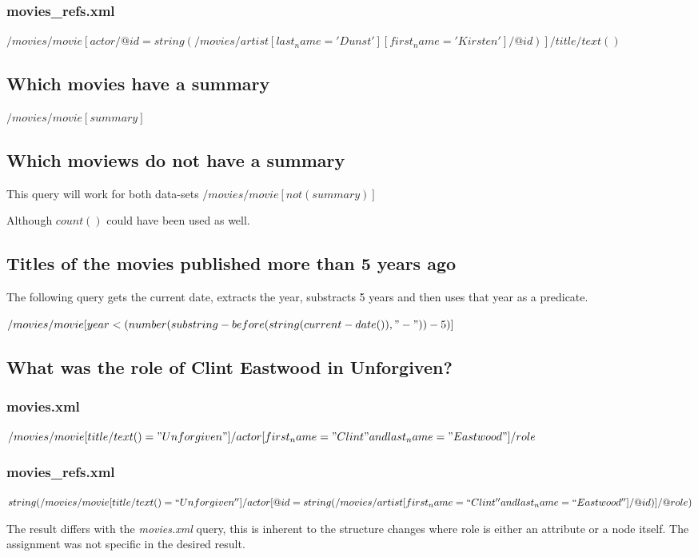 \subsubsection{movies_refs.xml}
$/movies/movie[
        actor/@id = string(/movies/artist[
            last_name='Dunst'
        ][
            first_name='Kirsten'
        ]
        /@id)
    ]
    /title/text()$

\subsection{Which movies have a summary}
$/movies/movie[summary]$

\subsection{Which moviews do not have a summary}
This query will work for both data-sets
$/movies/movie[not(summary)]$

Although $count()$ could have been used as  well.
\subsection{Titles of the movies published more than 5 years ago}
The following query gets the current date, extracts the year,
substracts 5 years and then uses that year as a predicate.

$/movies/movie[
        year < (number(substring-before(string(current-date()), "-")) -5)
    ]
$

\subsection{What was the role of Clint Eastwood in Unforgiven?}
\subsubsection{movies.xml}
$/movies/movie[title/text() = "Unforgiven"]/actor[first_name = "Clint" and last_name = "Eastwood"]/role$
\subsubsection{movies_refs.xml}
$string(/movies/movie[title/text() = ``Unforgiven'']/actor[
        @id = 
            string(/movies/artist[first_name= ``Clint'' and last_name = ``Eastwood'']/@id)
    ]/@role)
$

The result differs with the \emph{movies.xml} query, this is inherent
to the structure changes where role is either an attribute or a node
itself. The assignment was not specific in the desired result.

